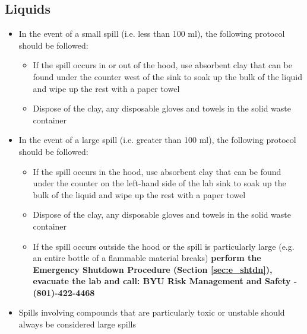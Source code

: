 \documentclass[letterpaper,11pt]{article}
\begin{document}
    \subsection{Liquids}
    \begin{itemize}
    
    \item In the event of a small spill (i.e. less than 100 ml), the following 
        protocol should be followed:
        \begin{itemize}
        \item If the spill occurs in or out of the hood, use absorbent clay that
            can be found under the counter west of the sink to soak up the 
            bulk of the liquid and wipe up the rest with a paper towel
        \item Dispose of the clay, any disposable gloves and towels in the solid 
            waste container
        \end{itemize}    
    \item In the event of a large spill (i.e. greater than 100 ml), the 
        following protocol should be followed:
        \begin{itemize}
        \item If the spill occurs in the hood, use absorbent clay that can be 
            found under the counter on the left-hand side of the lab sink to 
            soak up the bulk of the liquid and wipe up the rest with a paper 
            towel
        \item Dispose of the clay, any disposable gloves and towels in the solid 
            waste container
        \item If the spill occurs outside the hood or the spill is particularly 
            large (e.g. an entire bottle of a flammable material breaks) 
            \textbf{perform the Emergency Shutdown Procedure (Section 
            \ref{sec:e_shtdn}), evacuate the lab and call: BYU Risk Management 
            and Safety - (801)-422-4468} 
        \end{itemize}
    
    \item Spills involving compounds that are particularly toxic or unstable 
        should always be considered large spills
    
    \end{itemize}
\end{document}
